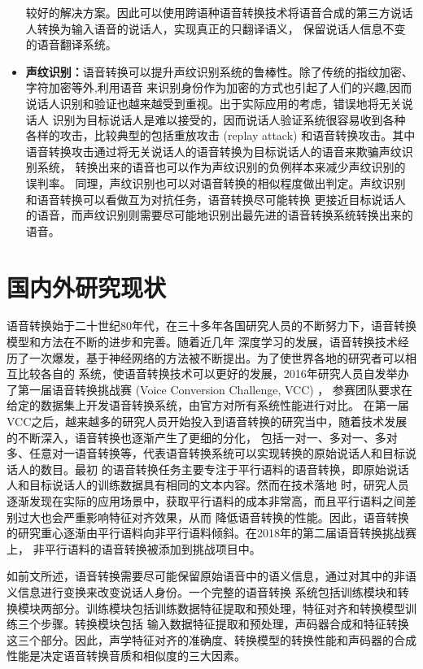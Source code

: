 \begin{itemize}
    较好的解决方案。因此可以使用跨语种语音转换技术将语音合成的第三方说话人转换为输入语音的说话人，实现真正的只翻译语义，
    保留说话人信息不变的语音翻译系统\cite{desai2010spectral}。
    \item \textbf{声纹识别：}语音转换可以提升声纹识别系统的鲁棒性。除了传统的指纹加密、字符加密等外,利用语音
    来识别身份作为加密的方式也引起了人们的兴趣,因而说话人识别和验证也越来越受到重视。出于实际应用的考虑，错误地将无关说话人
    识别为目标说话人是难以接受的，因而说话人验证系统很容易收到各种各样的攻击，比较典型的包括重放攻击 (replay attack) 
    和语音转换攻击。其中语音转换攻击通过将无关说话人的语音转换为目标说话人的语音来欺骗声纹识别系统，
    转换出来的语音也可以作为声纹识别的负例样本来减少声纹识别的误判率\cite{kinnunen2012vulnerability}。
    同理，声纹识别也可以对语音转换的相似程度做出判定。声纹识别和语音转换可以看做互为对抗任务，语音转换尽可能转换
    更接近目标说话人的语音，而声纹识别则需要尽可能地识别出最先进的语音转换系统转换出来的语音。

\end{itemize}

\section{国内外研究现状}
语音转换始于二十世纪80年代，在三十多年各国研究人员的不断努力下，语音转换模型和方法在不断的进步和完善。随着近几年
深度学习的发展，语音转换技术经历了一次爆发，基于神经网络的方法被不断提出。为了使世界各地的研究者可以相互比较各自的
系统，使语音转换技术可以更好的发展，2016年研究人员自发举办了第一届语音转换挑战赛 (Voice Conversion Challenge, VCC) ，
参赛团队要求在给定的数据集上开发语音转换系统，由官方对所有系统性能进行对比\cite{toda2016voice,wester2016analysis}。
在第一届VCC之后，越来越多的研究人员开始投入到语音转换的研究当中，随着技术发展的不断深入，语音转换也逐渐产生了更细的分化，
包括一对一、多对一、多对多、任意对一语音转换等，代表语音转换系统可以实现转换的原始说话人和目标说话人的数目。最初
的语音转换任务主要专注于平行语料的语音转换，即原始说话人和目标说话人的训练数据具有相同的文本内容。然而在技术落地
时，研究人员逐渐发现在实际的应用场景中，获取平行语料的成本非常高，而且平行语料之间差别过大也会严重影响特征对齐效果，从而
降低语音转换的性能。因此，语音转换的研究重心逐渐由平行语料向非平行语料倾斜。在2018年的第二届语音转换挑战赛上，
非平行语料的语音转换被添加到挑战项目中\cite{lorenzo2018voice}。

如前文所述，语音转换需要尽可能保留原始语音中的语义信息，通过对其中的非语义信息进行变换来改变说话人身份。一个完整的语音转换
系统包括训练模块和转换模块两部分。训练模块包括训练数据特征提取和预处理，特征对齐和转换模型训练三个步骤。转换模块包括
输入数据特征提取和预处理，声码器合成和特征转换这三个部分。因此，声学特征对齐的准确度、转换模型的转换性能和声码器的合成
性能是决定语音转换音质和相似度的三大因素。

